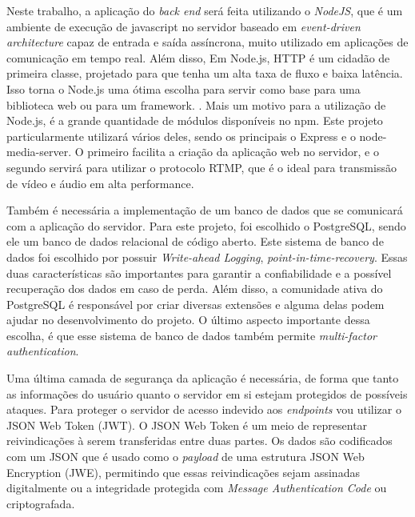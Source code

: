 \documentclass[12pt, %
openright, 
oneside, %
a4paper,    %
brazil]{facom-ufu-abntex2}
\begin{document}

Neste trabalho, a aplicação do \emph{back end} será feita utilizando o \emph{NodeJS}, que é um
ambiente de execução de javascript no servidor baseado em \emph{event-driven architecture} capaz
de entrada e saída assíncrona, muito utilizado em aplicações de comunicação em tempo real. \cite{aboutnodejs}
Além disso, Em Node.js, HTTP é um cidadão de primeira classe, projetado para que tenha um alta taxa de fluxo e baixa latência. 
Isso torna o Node.js uma ótima escolha para servir como base para uma biblioteca web ou para um framework. \cite{NodeJSaboutoriginal}.
Mais um motivo para a utilização de Node.js, é a grande quantidade de módulos disponíveis no npm. Este projeto particularmente
utilizará vários deles, sendo os principais o Express e o node-media-server. O primeiro facilita a criação da aplicação web no servidor,
e o segundo servirá para utilizar o protocolo RTMP, que é o ideal para transmissão de vídeo e áudio em alta performance. 
 
Também é necessária a implementação de um banco de dados que se comunicará com a aplicação do servidor. Para este projeto,
foi escolhido o PostgreSQL, sendo ele um banco de dados relacional de código aberto. Este sistema de banco de dados foi escolhido
por possuir \emph{Write-ahead Logging}, \emph{point-in-time-recovery}. Essas duas características são importantes para garantir
a confiabilidade e a possível recuperação dos dados em caso de perda. Além disso, a comunidade ativa do PostgreSQL é responsável
por criar diversas extensões e alguma delas podem ajudar no desenvolvimento do projeto. O último aspecto importante dessa escolha,
é que esse sistema de banco de dados também permite \emph{multi-factor authentication}. \cite{aboutPostgre}

Uma última camada de segurança da aplicação é necessária, de forma que tanto as informações do usuário
quanto o servidor em si estejam protegidos de possíveis ataques. Para proteger o servidor de acesso indevido aos \emph{endpoints}
vou utilizar o JSON Web Token (JWT). O JSON Web Token é um meio de representar reivindicações à serem transferidas entre duas partes.
Os dados são codificados com um JSON que é usado como o \emph{payload} de uma estrutura  JSON Web Encryption (JWE), permitindo que essas
reivindicações sejam assinadas digitalmente ou a integridade protegida com \emph{Message Authentication Code} ou criptografada. \cite{jsonwebtoken}
\end{document}
